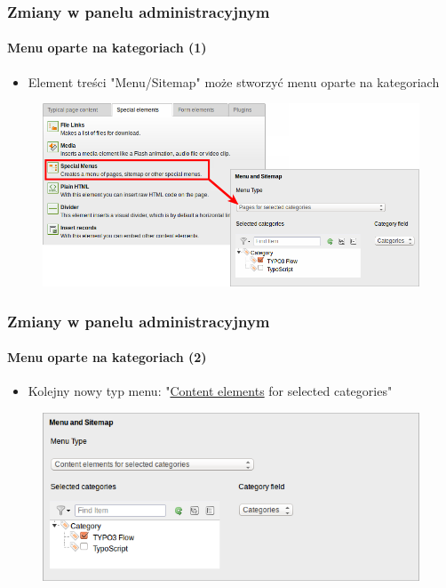 
\begin{frame}[fragile]
	\frametitle{Zmiany w panelu administracyjnym}
	\framesubtitle{Menu oparte na kategoriach (1)}

	\begin{itemize}
		\item Element treści "Menu/Sitemap" może stworzyć menu oparte na kategoriach
	\end{itemize}

	\begin{figure}
		\includegraphics[width=0.8\linewidth]{Images/BackendChanges/CategoryBasedMenus.png}
	\end{figure}

\end{frame}


\begin{frame}[fragile]
	\frametitle{Zmiany w panelu administracyjnym}
	\framesubtitle{Menu oparte na kategoriach (2)}

	\begin{itemize}
		\item Kolejny nowy typ menu: "\underline{Content elements} for selected categories"
	\end{itemize}

	\begin{figure}
		\includegraphics[width=0.6\linewidth]{Images/BackendChanges/ContentElementsForSelectedCategories.png}
	\end{figure}

\end{frame}


